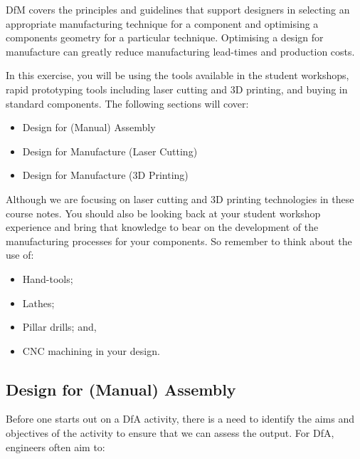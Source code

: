 \acf{DfM} covers the principles and guidelines that support designers in selecting an appropriate manufacturing technique for a component and optimising a components geometry for a particular technique. Optimising a design for manufacture can greatly reduce manufacturing lead-times and production costs. 

In this exercise, you will be using the tools available in the student workshops, rapid prototyping tools including laser cutting and 3D printing, and buying in standard components. The following sections will cover:

\begin{itemize}
    \item Design for (Manual) Assembly
    \item Design for Manufacture (Laser Cutting)
    \item Design for Manufacture (3D Printing)
\end{itemize}

Although we are focusing on laser cutting and 3D printing technologies in these course notes.
You should also be looking back at your student workshop experience and bring that knowledge to bear on the development of the manufacturing processes for your components.
So remember to think about the use of:

\begin{itemize}
    \item Hand-tools;
    \item Lathes;
    \item Pillar drills; and,
    \item CNC machining in your design.
\end{itemize}

\subsection{Design for (Manual) Assembly}

Before one starts out on a DfA activity, there is a need to identify the aims and objectives of the activity to ensure that we can assess the output.
For DfA, engineers often aim to:

